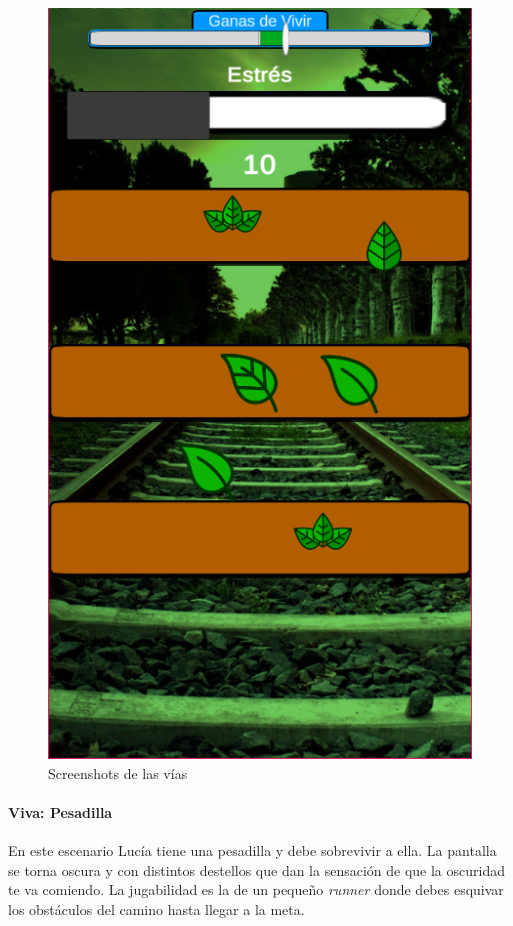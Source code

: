 \begin{figure}[h]
\begin{minipage}{0.45\textwidth}
\begin{flushright}
            \includegraphics[scale=.5]{imgs/screenshot12.png}
        \end{flushright}
    \end{minipage}
    \caption{Screenshots de las vías}
    \label{multifig:calma}
\end{figure}

\newpage
\paragraph{Viva: Pesadilla}
En este escenario Lucía tiene una pesadilla y debe sobrevivir a ella. La pantalla se torna oscura y con distintos destellos que dan la sensación de que la oscuridad te va comiendo. La jugabilidad es la de un pequeño \textit{runner} donde debes esquivar los obstáculos del camino hasta llegar a la meta.


